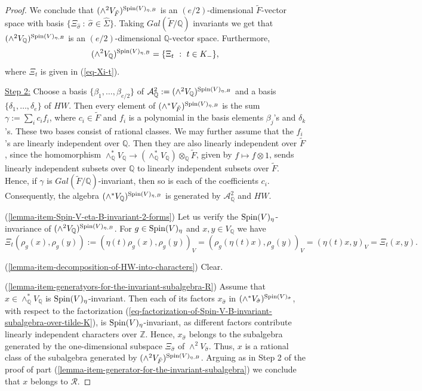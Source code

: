 \documentclass[12pt]{amsart}
\numberwithin{equation}{subsection}
\theoremstyle{plain}
\theoremstyle{definition}
\newcommand{\A}{{\mathcal A}}
\newcommand{\QQ}{{\mathbb Q}}
\newcommand{\R}{{\mathcal R}}
\newcommand{\ZZ}{{\mathbb Z}}
\newcommand{\Spin}{{\rm Spin}}
\begin{document}
{\begin{proof}
We conclude that $(\wedge^2V_{\tilde{F}})^{\Spin(V)_{\eta,B}}$ is an $(e/2)$-dimensional $\tilde{F}$-vector space with basis 
$\{\Xi_{\hat{\sigma}} \ : \ \hat{\sigma}\in\hat{\Sigma}\}$. Taking $Gal(\tilde{F}/\QQ)$ invariants we get that
$(\wedge^2V_\QQ)^{\Spin(V)_{\eta,B}}$ is an $(e/2)$-dimensional $\QQ$-vector space. Furthermore,
\[
(\wedge^2V_\QQ)^{\Spin(V)_{\eta,B}}=\{\Xi_t \ : \ t\in K_-\},
\]
 where $\Xi_t$ is given in (\ref{eq-Xi-t}).

\underline{Step 2:} Choose a basis $\{\beta_1, \dots, \beta_{e/2}\}$ of $\A^2_\QQ:=(\wedge^2V_\QQ)^{\Spin(V)_{\eta,B}}$ and a basis 
$\{\delta_1, \dots, \delta_e\}$ of $HW$. Then every element of $(\wedge^*V_{\tilde{F}})^{\Spin(V)_{\eta,B}}$ is the sum 
$\gamma:=\sum_i c_if_i$, where $c_i\in\tilde{F}$ and $f_i$ is a polynomial in the basis elements $\beta_j$'s and $\delta_k$'s. 
These two bases consist of rational classes. 
We may  further assume that the $f_i$'s are linearly independent over $\QQ$. Then they are also linearly independent over $\tilde{F}$,
since the homomorphism $\wedge^*_\QQ V_\QQ\rightarrow (\wedge^*_\QQ V_\QQ)\otimes_\QQ\tilde{F}$, given by $f\mapsto f\otimes 1$, sends linearly independent subsets over $\QQ$ to linearly independent subsets over $\tilde{F}$.
Hence, if $\gamma$ is $Gal(\tilde{F}/\QQ)$-invariant, then so is each of the coefficients $c_i$. 
Consequently, the algebra $(\wedge^*V_\QQ)^{\Spin(V)_{\eta,B}}$ is generated by $\A^2_\QQ$ and $HW$.

(\ref{lemma-item-Spin-V-eta-B-invariant-2-forms})
Let us verify the $\Spin(V)_\eta$-invariance of $(\wedge^2V_\QQ)^{\Spin(V)_{\eta,B}}$.  For $g\in\Spin(V)_\eta$ and $x,y\in V_\QQ$ we have
\[
\Xi_t(\rho_g(x),\rho_g(y)):=(\eta(t)\rho_g(x),\rho_g(y))_V=(\rho_g(\eta(t)x),\rho_g(y))_V=(\eta(t)x,y)_V=\Xi_t(x,y).
\]

(\ref{lemma-item-decomposition-of-HW-into-characters}) Clear.

(\ref{lemma-item-generatyors-for-the-invariant-subalgebra-R}) 
Assume that $x\in\wedge^*_\QQ V_\QQ$ is $\Spin(V)_\eta$-invariant. Then each of its factors $x_{\hat{\sigma}}$ in $(\wedge^*V_{\hat{\sigma}})^{\Spin(V)_{\hat{\sigma}}}$, with respect to the factorization (\ref{eq-factorization-of-Spin-V-B-invariant-subalgebra-over-tilde-K}), is $\Spin(V)_\eta$-invariant, as different factors contribute linearly independent characters over $\ZZ$. Hence, $x_{\hat{\sigma}}$ belongs to the subalgebra generated by the one-dimensional subspace $\Xi_{\hat{\sigma}}$ of $\wedge^2V_{\hat{\sigma}}$. Thus, $x$ is a rational class of the subalgebra generated by 
$(\wedge^2V_{\tilde{F}})^{\Spin(V)_{\eta,B}}$. Arguing as in Step 2 of the proof of part (\ref{lemma-item-generator-for-the-invariant-subalgebra}) we conclude that $x$ belongs to $\R$.
\end{proof}

}
\end{document}
